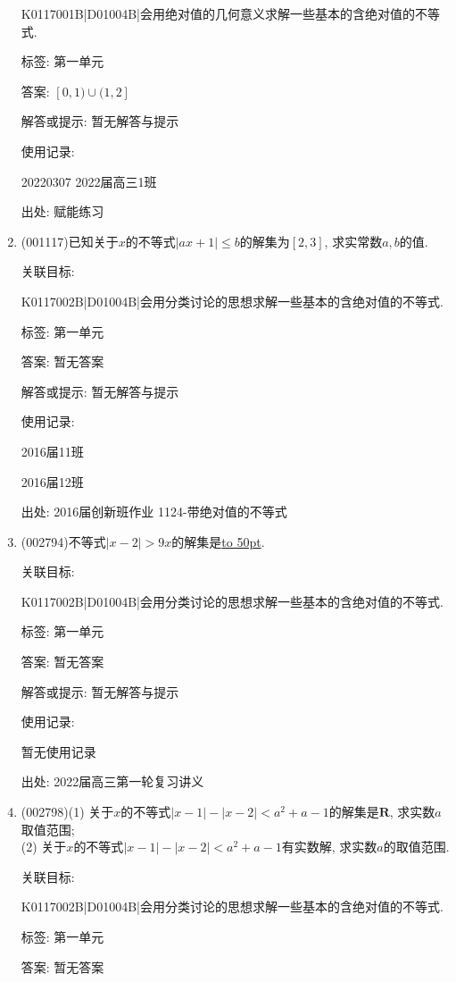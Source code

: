 \documentclass[10pt,a4paper]{article}
\newcommand{\blank}[1]{\underline{\hbox to #1pt{}}}
\begin{document}
\begin{enumerate}[1.]
K0117001B|D01004B|会用绝对值的几何意义求解一些基本的含绝对值的不等式.



标签: 第一单元

答案: $[0,1)\cup (1,2]$

解答或提示: 暂无解答与提示

使用记录:

20220307	2022届高三1班	


出处: 赋能练习
\item { (001117)}已知关于$x$的不等式$|ax+1|\leq b$的解集为$[2,3]$, 求实常数$a,b$的值.


关联目标:

K0117002B|D01004B|会用分类讨论的思想求解一些基本的含绝对值的不等式.



标签: 第一单元

答案: 暂无答案

解答或提示: 暂无解答与提示

使用记录:

2016届11班	

2016届12班	


出处: 2016届创新班作业	1124-带绝对值的不等式
\item { (002794)}不等式$|x-2|>9x$的解集是\blank{50}.


关联目标:

K0117002B|D01004B|会用分类讨论的思想求解一些基本的含绝对值的不等式.



标签: 第一单元

答案: 暂无答案

解答或提示: 暂无解答与提示

使用记录:

暂无使用记录


出处: 2022届高三第一轮复习讲义
\item { (002798)}(1) 关于$x$的不等式$|x-1|-|x-2|<a^2+a-1$的解集是$\mathbf{R}$, 求实数$a$取值范围;\\
(2) 关于$x$的不等式$|x-1|-|x-2|<a^2+a-1$有实数解, 求实数$a$的取值范围.


关联目标:

K0117002B|D01004B|会用分类讨论的思想求解一些基本的含绝对值的不等式.



标签: 第一单元

答案: 暂无答案


\end{enumerate}
\end{document}
